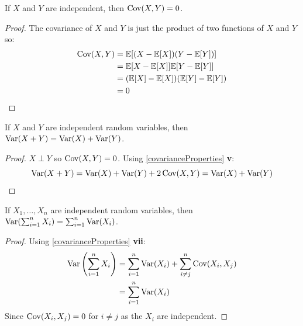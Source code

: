 \documentclass[../main.tex]{subfiles}
\begin{document}
\begin{corollary}
  If $X$ and $Y$ are independent, then $\operatorname{Cov}(X, Y) = 0$.
\end{corollary}
\begin{proof}
  The covariance of $X$ and $Y$ is just the product of two functions of $X$ and $Y$ so:
  \begin{align*}
    \operatorname{Cov}(X, Y) &= \mathbb{E}[(X - \mathbb{E}[X])(Y - \mathbb{E}[Y])] \\
               &= \mathbb{E}[X - \mathbb{E}[X]]\mathbb{E}[Y - \mathbb{E}[Y]] \\
               &= (\mathbb{E}[X] - \mathbb{E}[X])(\mathbb{E}[Y] - \mathbb{E}[Y]) \\
               &= 0
  \end{align*}
\end{proof}
\begin{corollary}
  If $X$ and $Y$ are independent random variables, then $\operatorname{Var}(X + Y) = \operatorname{Var}(X) + \operatorname{Var}(Y)$.
\end{corollary}
\begin{proof}
  $X \perp Y$ so $\operatorname{Cov}(X, Y) = 0$.
  Using \cref{covarianceProperties} \textbf{v}:
  \[
    \operatorname{Var}(X + Y) = \operatorname{Var}(X) + \operatorname{Var}(Y) + 2\operatorname{Cov}(X, Y) = \operatorname{Var}(X) + \operatorname{Var}(Y)
  \]
\end{proof}
\begin{corollary}
  If $X_1, \ldots, X_n$ are independent random variables, then $\operatorname{Var}(\sum_{i = 1}^{n} X_i) = \sum_{i = 1}^{n} \operatorname{Var}(X_i)$.
\end{corollary}
\begin{proof}
  Using \cref{covarianceProperties} \textbf{vii}:
  \begin{align*}
    \operatorname{Var}\left(\sum_{i = 1}^{n} X_i\right) &= \sum_{i = 1}^{n} \operatorname{Var}(X_i) + \sum_{i \neq j}^{n} \operatorname{Cov}(X_i, X_j) \\
                                          &= \sum_{i = 1}^{n} \operatorname{Var}(X_i)
  \end{align*}
  Since $\operatorname{Cov}(X_i, X_j) = 0$ for $i \neq j$ as the $X_i$ are independent.
\end{proof}
\end{document}
